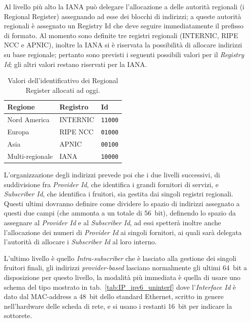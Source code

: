 Al livello più alto la IANA può delegare l'allocazione a delle autorità
regionali (i Regional Register) assegnando ad esse dei blocchi di indirizzi; a
queste autorità regionali è assegnato un Registry Id che deve seguire
immediatamente il prefisso di formato. Al momento sono definite tre registri
regionali (INTERNIC, RIPE NCC e APNIC), inoltre la IANA si è riservata la
possibilità di allocare indirizzi su base regionale; pertanto sono previsti
i seguenti possibili valori per il \textsl{Registry Id};
gli altri valori restano riservati per la IANA.
\begin{table}[htb]
  \centering 
  \footnotesize
    \begin{tabular}{|l|l|l|}
      \hline
      \textbf{Regione} & \textbf{Registro} & \textbf{Id} \\
      \hline
      \hline
      Nord America &INTERNIC & \texttt{11000} \\
      Europa & RIPE NCC & \texttt{01000} \\
      Asia & APNIC & \texttt{00100} \\
      Multi-regionale & IANA &\texttt{10000} \\
      \hline
    \end{tabular}
    \caption{Valori dell'identificativo dei 
      Regional Register allocati ad oggi.}
    \label{tab:IP_ipv6_regid}
\end{table}

L'organizzazione degli indirizzi prevede poi che i due livelli successivi, di
suddivisione fra \textit{Provider Id}, che identifica i grandi fornitori di
servizi, e \textit{Subscriber Id}, che identifica i fruitori, sia gestita dai
singoli registri regionali. Questi ultimi dovranno definire come dividere lo
spazio di indirizzi assegnato a questi due campi (che ammonta a un totale di
56~bit), definendo lo spazio da assegnare al \textit{Provider Id} e
al \textit{Subscriber Id}, ad essi spetterà inoltre anche l'allocazione dei
numeri di \textit{Provider Id} ai singoli fornitori, ai quali sarà delegata
l'autorità di allocare i \textit{Subscriber Id} al loro interno.

L'ultimo livello è quello \textit{Intra-subscriber} che è lasciato alla
gestione dei singoli fruitori finali, gli indirizzi \textit{provider-based}
lasciano normalmente gli ultimi 64~bit a disposizione per questo livello, la
modalità più immediata è quella di usare uno schema del tipo mostrato in
tab.~\ref{tab:IP_ipv6_uninterf} dove l'\textit{Interface Id} è dato dal
MAC-address a 48~bit dello standard Ethernet, scritto in genere nell'hardware
delle scheda di rete, e si usano i restanti 16~bit per indicare la sottorete.


